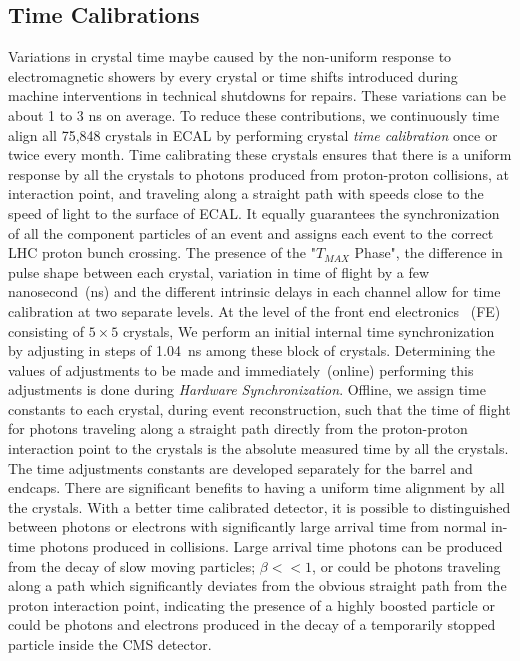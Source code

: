\subsection{Time Calibrations}
Variations in crystal time maybe caused by the non-uniform response to electromagnetic showers  by every crystal or time shifts introduced during machine interventions in technical shutdowns for repairs. These variations can be about 1 to 3 ns on average. To reduce these contributions, we continuously time align all 75,848 \pb crystals in ECAL by performing crystal \textit{time calibration} once or twice every month. 
Time calibrating these crystals ensures that there is a uniform response by all the crystals to photons produced from proton-proton collisions, at interaction point, and traveling along a straight path with speeds close to the speed of light to the surface of ECAL. It equally guarantees the synchronization of all the component particles of an event and assigns each event to the correct LHC proton bunch crossing. 
\newline
The presence of the "$T_{MAX}$ Phase", the difference in pulse shape between each crystal, variation in time of flight by a few nanosecond~(ns) and the different intrinsic delays in each channel allow for time calibration at two separate levels. At the level of the front end electronics ~(FE) consisting of $5\times5$ crystals, We perform an initial internal time synchronization by adjusting in steps of 1.04~ns among these block of crystals. Determining the values of adjustments to be made and immediately~(online) performing this adjustments is done during \textit{Hardware Synchronization}. Offline, we assign time constants to each crystal, during event reconstruction, such that the time of flight for photons traveling along a straight path directly from the proton-proton interaction point to the crystals is the absolute measured time by all the crystals.
The time adjustments constants are developed separately for the barrel and endcaps.
There are significant benefits to having a uniform time alignment by all the crystals. With a better time calibrated detector, it is possible to distinguished between photons or electrons with significantly large arrival time from normal in-time photons produced in collisions. Large arrival time photons can be produced from the decay of slow moving particles; $\beta << 1$, or could be photons traveling along a path which significantly deviates from the obvious straight path from the proton interaction point, indicating the presence of a highly boosted particle or could be photons and electrons produced in the decay of a temporarily stopped particle inside the CMS detector. 

